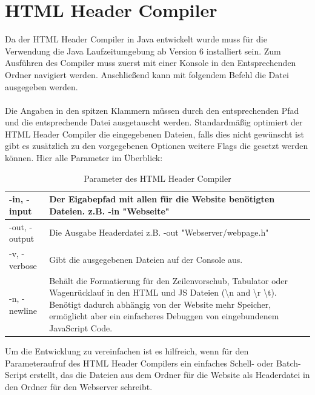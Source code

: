 \section{HTML Header Compiler}

Da der HTML Header Compiler in Java entwickelt wurde muss für die Verwendung die
Java Laufzeitumgebung ab Version 6 installiert sein. Zum Ausführen des Compiler
muss zuerst mit einer Konsole in den Entsprechenden Ordner navigiert werden.
Anschließend kann mit folgendem Befehl die Datei ausgegeben werden. 
\\

\\

Die Angaben in den spitzen Klammern müssen durch den entsprechenden Pfad und
die entsprechende Datei ausgetauscht werden. Standardmäßig optimiert der
HTML Header Compiler die eingegebenen Dateien, falls dies nicht gewünscht ist
gibt es zusätzlich zu den vorgegebenen Optionen weitere Flags
die gesetzt werden können. Hier alle Parameter im Überblick:

\begin{table}[H]
\begin{tabular}{| p{} | p{} |}
\hline
-in, -input & Der Eigabepfad mit allen für die Website benötigten Dateien. z.B. \textrm{-in "Webseite"} \\ \hline 
-out, -output & Die Ausgabe Headerdatei z.B. \textrm{-out "Webserver/webpage.h"} \\ \hline
-v, -verbose &  Gibt die ausgegebenen Dateien auf der Console aus. \\  
 \hline 
 -n, -newline & Behält die Formatierung für den Zeilenvorschub, Tabulator
 oder Wagenrücklauf in den HTML und JS Dateien (\textbackslash n and
 \textbackslash r \textbackslash t).
 Benötigt dadurch abhängig von der Website mehr Speicher, ermöglicht aber ein
 einfacheres Debuggen von eingebundenem JavaScript Code.  \\ \hline
\end{tabular}
\caption{Parameter des HTML Header Compiler}
\label{parameterHHC}
\end{table}

Um die Entwicklung zu vereinfachen ist es hilfreich, wenn für den Parameteraufruf
des HTML Header Compilers ein einfaches Schell- oder Batch-Script erstellt, das
die Dateien aus dem Ordner für die Website als Headerdatei in den Ordner für den
Webserver schreibt.

